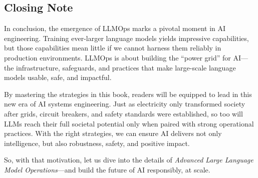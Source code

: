 \subsection*{Closing Note}
In conclusion, the emergence of LLMOps marks a pivotal moment in AI engineering. Training ever-larger language models yields impressive capabilities, but those capabilities mean little if we cannot harness them reliably in production environments. LLMOps is about building the ``power grid'' for AI---the infrastructure, safeguards, and practices that make large-scale language models usable, safe, and impactful.  

By mastering the strategies in this book, readers will be equipped to lead in this new era of AI systems engineering. Just as electricity only transformed society after grids, circuit breakers, and safety standards were established, so too will LLMs reach their full societal potential only when paired with strong operational practices. With the right strategies, we can ensure AI delivers not only intelligence, but also robustness, safety, and positive impact.  

So, with that motivation, let us dive into the details of \emph{Advanced Large Language Model Operations}---and build the future of AI responsibly, at scale.
\printbibliography[
  heading=subbibliography,
  segment=\therefsegment,
  resetnumbers=true
]
